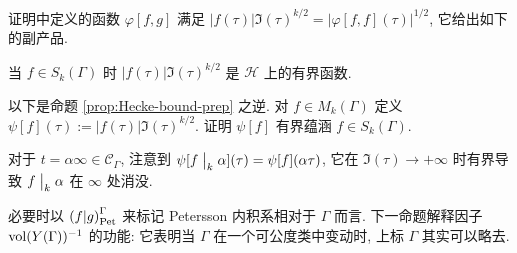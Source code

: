 证明中定义的函数 $\varphi[f, g]$ 满足 $|f(\tau)| \Im(\tau)^{k/2} = \left|\varphi[f,f](\tau)\right|^{1/2}$, 它给出如下的副产品.

\begin{proposition}\label{prop:Hecke-bound-prep}
	当 $f \in S_k(\Gamma)$ 时 $|f(\tau)| \Im(\tau)^{k/2}$ 是 $\mathcal{H}$ 上的有界函数.
\end{proposition}

\begin{exercise}
	以下是命题 \ref{prop:Hecke-bound-prep} 之逆. 对 $f \in M_k(\Gamma)$ 定义 $\psi[f](\tau) := |f(\tau)| \Im(\tau)^{k/2}$. 证明 $\psi[f]$ 有界蕴涵 $f \in S_k(\Gamma)$.
	
	\begin{hint}
		对于 $t = \alpha \infty \in \mathcal{C}_\Gamma$, 注意到 $\psi[f \;\big|_{k} \; \alpha](\tau) = \psi[f](\alpha\tau)$, 它在 $\Im(\tau) \to +\infty$ 时有界导致 $f \;\big|_{k} \; \alpha$ 在 $\infty$ 处消没.
	\end{hint}
\end{exercise}


必要时以 $\left( f \middle| g \right)_{\mathrm{Pet}}^\Gamma$ 来标记 Petersson 内积系相对于 $\Gamma$ 而言. 下一命题解释因子 $\operatorname{vol}(Y(\Gamma))^{-1}$ 的功能: 它表明当 $\Gamma$ 在一个可公度类中变动时, 上标 $\Gamma$ 其实可以略去.

